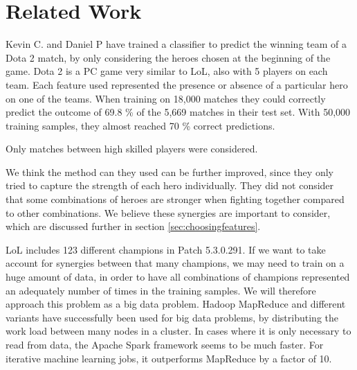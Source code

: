 \section{Related Work}\label{sec:relatedwork}

Kevin C. and Daniel P have trained a classifier to predict the winning team of a Dota 2 match\cite{dota2article}, by only considering the heroes chosen at the beginning of the game. Dota 2 is a PC game very similar to LoL, also with 5 players on each team.
Each feature used represented the presence or absence of a particular hero on one of the teams.
When training on 18,000 matches they could correctly predict the outcome of 69.8 \% of the 5,669 matches in their test set.
With 50,000 training samples, they almost reached 70 \% correct predictions.

Only matches between high skilled players were considered.

We think the method can they used can be further improved, since they only tried to capture the strength of each hero individually.
They did not consider that some combinations of heroes are stronger when fighting together compared to other combinations.
We believe these synergies are important to consider, which are discussed further in section \ref{sec:choosingfeatures}.

LoL includes 123 different champions in Patch 5.3.0.291. If we want to take account for synergies between that many champions, we may need to train on a huge amount of data, in order to have all combinations of champions represented an adequately number of times in the training samples. We will therefore approach this problem as a big data problem.
Hadoop MapReduce and different variants have successfully been used for big data problems, by distributing the work load between many nodes in a cluster\cite{ApacheSpark}.
In cases where it is only necessary to read from data, the Apache Spark framework seems to be much faster.
For iterative machine learning jobs, it outperforms MapReduce by a factor of 10.

